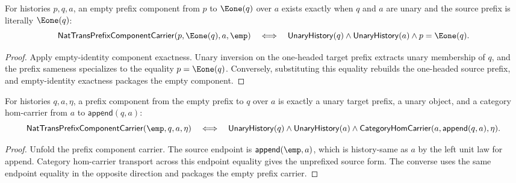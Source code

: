 \begin{theorem}
\label{thm:nattrans-prefix-component-e1-target-empty-component-iff}
For histories $p,q,a$, an empty prefix component from $p$ to $\Eone(q)$ over
$a$ exists exactly when $q$ and $a$ are unary and the source prefix is literally
$\Eone(q)$:
$$
\mathsf{NatTransPrefixComponentCarrier}(p,\Eone(q),a,\emp)
\quad\Longleftrightarrow\quad
\mathsf{UnaryHistory}(q)\wedge\mathsf{UnaryHistory}(a)\wedge p=\Eone(q).
$$
\end{theorem}
\begin{proof}
Apply empty-identity component exactness. Unary inversion on the one-headed
target prefix extracts unary membership of $q$, and the prefix sameness
specializes to the equality $p=\Eone(q)$. Conversely, substituting this equality
rebuilds the one-headed source prefix, and empty-identity exactness packages
the empty component.
\end{proof}

\begin{theorem}
\label{thm:nattrans-prefix-component-carrier-empty-source-prefix}
For histories $q,a,\eta$, a prefix component from the empty prefix to $q$ over
$a$ is exactly a unary target prefix, a unary object, and a category hom-carrier
from $a$ to $\mathsf{append}(q,a)$:
$$
\mathsf{NatTransPrefixComponentCarrier}(\emp,q,a,\eta)
\quad\Longleftrightarrow\quad
\mathsf{UnaryHistory}(q)\wedge
\mathsf{UnaryHistory}(a)\wedge
\mathsf{CategoryHomCarrier}(a,\mathsf{append}(q,a),\eta).
$$
\end{theorem}
\begin{proof}
Unfold the prefix component carrier. The source endpoint is
$\mathsf{append}(\emp,a)$, which is history-same as $a$ by the left unit law for
append. Category hom-carrier transport across this endpoint equality gives the
unprefixed source form. The converse uses the same endpoint equality in the
opposite direction and packages the empty prefix carrier.
\end{proof}

